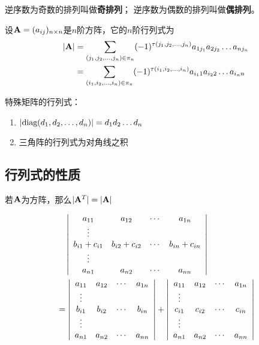 \begin{definition}[奇、偶排列]
  逆序数为奇数的排列叫做\textbf{奇排列}；
  逆序数为偶数的排列叫做\textbf{偶排列}。
\end{definition}

\begin{definition}[$n$阶行列式]
  设$\mmA=(a_{ij})_{n\times n}$是$n$阶方阵，它的$n$阶行列式为
  \begin{align*}
    |\mmA| &= \sum_{(j_1,j_2,\dots,j_n)\in\pi_n}
    (-1)^{\tau(j_1,j_2,\dots,j_n)}a_{1j_1}a_{2j_2}\dots a_{nj_n} \\
    &= \sum_{(i_1,i_2,\dots,i_n)\in\pi_n}
    (-1)^{\tau(i_1,i_2,\dots,i_n)}a_{i_1 1}a_{i_2 2}\dots a_{i_n n} 
  \end{align*}
\end{definition}

特殊矩阵的行列式：
\begin{enumerate}
  \item $|\mdiag(d_1,d_2,\dots,d_n)| = d_1d_2\dots d_n$
  \item 三角阵的行列式为对角线之积
\end{enumerate}

\subsection{行列式的性质}
\begin{theorem}
  若$\mmA$为方阵，那么$|\mmA^T| = |\mmA|$
\end{theorem}

\begin{theorem}
  \begin{align*}
    &\quad\mdet{cccc}{
      a_{11} & a_{12} & \cdots & a_{1n} \\
      \vdots &        &        &        \\
      b_{i1} + c_{i1} & b_{i2} + c_{i2}  & \cdots & b_{in} + c_{in} \\
      \vdots &        &        &        \\
      a_{n1} & a_{n2} & \cdots & a_{nn} } \\
    &= \mdet{cccc}{
      a_{11} & a_{12} & \cdots & a_{1n} \\
      \vdots &        &        &        \\
      b_{i1} & b_{i2} & \cdots & b_{in} \\
      \vdots &        &        &        \\
      a_{n1} & a_{n2} & \cdots & a_{nn} }
    + \mdet{cccc}{
      a_{11} & a_{12} & \cdots & a_{1n} \\
      \vdots &        &        &        \\
      c_{i1} & c_{i2} & \cdots & c_{in} \\
      \vdots &        &        &        \\
      a_{n1} & a_{n2} & \cdots & a_{nn} }
    \end{align*}
\end{theorem}

